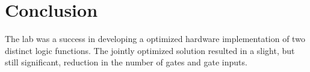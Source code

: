 \documentclass[12pt]{article}
\begin{document}
\section{Conclusion}

The lab was a success in developing a optimized hardware implementation
of two distinct logic functions.
The jointly optimized solution resulted in a slight, but still significant,
reduction in the number of gates and gate inputs.


%
%

\end{document}
